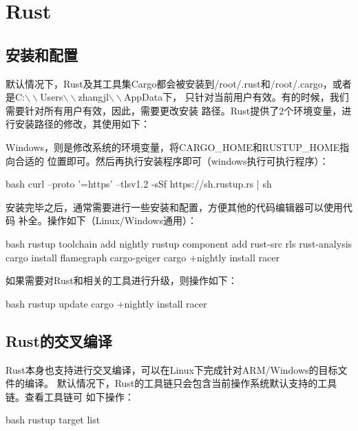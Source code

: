 \chapter{Rust}

\section{安装和配置}
默认情况下，Rust及其工具集Cargo都会被安装到/root/.rust和/root/.cargo，或者
是C:$\backslash\backslash$Users$\backslash\backslash$zhangjl$\backslash\backslash$AppData下，
只针对当前用户有效。有的时候，我们需要针对所有用户有效，因此，需要更改安装
路径。Rust提供了2个环境变量，进行安装路径的修改，其使用如下：

Windows，则是修改系统的环境变量，将CARGO\_HOME和RUSTUP\_HOME指向合适的
位置即可。然后再执行安装程序即可（windows执行可执行程序）：
\begin{code-block}{bash}
curl --proto '=https' --tlsv1.2 -sSf https://sh.rustup.rs | sh
\end{code-block}

安装完毕之后，通常需要进行一些安装和配置，方便其他的代码编辑器可以使用代码
补全。操作如下（Linux/Windows通用）：
\begin{code-block}{bash}
rustup toolchain add nightly
rustup component add rust-src rls rust-analysis
cargo install flamegraph cargo-geiger
cargo +nightly install racer
\end{code-block}

如果需要对Rust和相关的工具进行升级，则操作如下：
\begin{code-block}{bash}
rustup update
cargo +nightly install racer
\end{code-block}

\section{Rust的交叉编译}
Rust本身也支持进行交叉编译，可以在Linux下完成针对ARM/Windows的目标文件的编译。
默认情况下，Rust的工具链只会包含当前操作系统默认支持的工具链。查看工具链可
如下操作：
\begin{code-block}{bash}
rustup target list
\end{code-block}


